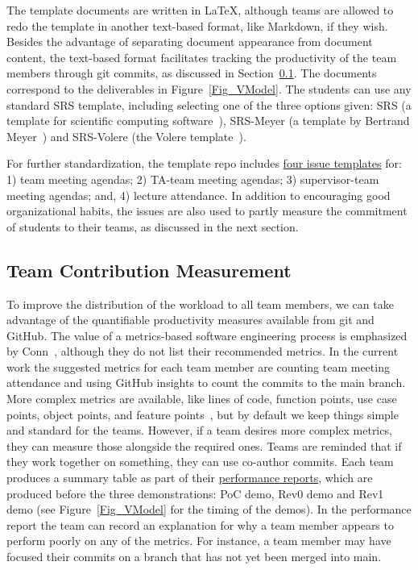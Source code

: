 \documentclass[10pt, conference]{IEEEtran}
\begin{document}
The template documents are written in \LaTeX, although teams are allowed to redo
the template in another text-based format, like Markdown, if they wish. Besides
the advantage of separating document appearance from document content, the
text-based format facilitates tracking the productivity of the team members
through git commits, as discussed in Section~\ref{Sec_TeamContribMeasure}. The
documents correspond to the deliverables in Figure~\ref{Fig_VModel}. The
students can use any standard SRS template, including selecting one of the three
options given: SRS (a template for scientific computing
software~\cite{SmithAndLai2005}), SRS-Meyer (a template by Bertrand
Meyer~\cite{Meyer2022}) and SRS-Volere (the Volere
template~\cite{RobertsonAndRobertson1999Vol}).

For further standardization, the template repo includes
\href{Redact link}
{four issue templates} for: 1) team meeting agendas; 2) TA-team meeting agendas;
3) supervisor-team meeting agendas; and, 4) lecture attendance.  In addition to
encouraging good organizational habits, the issues are also used to partly
measure the commitment of students to their teams, as discussed in the next
section.

\subsection{Team Contribution Measurement} \label{Sec_TeamContribMeasure}

To improve the distribution of the workload to all team members, we can take
advantage of the quantifiable productivity measures available from git and
GitHub.  The value of a metrics-based software engineering process is emphasized
by Conn~\cite{connReusableAcademicstrengthMetricsbased2004}, although they do
not list their recommended metrics.  In the current work the suggested metrics
for each team member are counting team meeting attendance and using GitHub
insights to count the commits to the main branch.  More complex metrics are
available, like lines of code, function points, use case points, object points,
and feature points~\cite{sudhakarMeasuringProductivitySoftware2012}, but by
default we keep things simple and standard for the teams.  However, if a team
desires more complex metrics, they can measure those alongside the required
ones. Teams are reminded that if they work together on something, they can use
co-author commits. Each team produces a summary table as part of their
\href{REDACT LINK}  
{performance reports}, which are produced before the three demonstrations: PoC
demo, Rev0 demo and Rev1 demo (see Figure~\ref{Fig_VModel} for the timing of the
demos). In the performance report the team can record an explanation for why a
team member appears to perform poorly on any of the metrics. For instance, a
team member may have focused their commits on a branch that has not yet been
merged into main.
\end{document}
